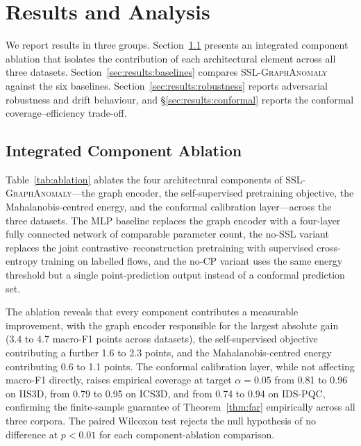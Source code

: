 \documentclass{ieeeaccess}
\begin{document}
\section{Results and Analysis}
\label{sec:results}
We report results in three groups. Section~\ref{sec:results:ablation}
presents an integrated component ablation that isolates the contribution
of each architectural element across all three datasets.
Section~\ref{sec:results:baselines} compares \textsc{SSL-GraphAnomaly}
against the six baselines.  Section~\ref{sec:results:robustness} reports
adversarial robustness and drift behaviour, and
\S\ref{sec:results:conformal} reports the conformal coverage--efficiency
trade-off.

\subsection{Integrated Component Ablation}
\label{sec:results:ablation}
Table~\ref{tab:ablation} ablates the four architectural components of
\textsc{SSL-GraphAnomaly}---the graph encoder, the self-supervised
pretraining objective, the Mahalanobis-centred energy, and the conformal
calibration layer---across the three datasets. The MLP baseline replaces
the graph encoder with a four-layer fully connected network of comparable
parameter count, the no-SSL variant replaces the joint
contrastive--reconstruction pretraining with supervised cross-entropy
training on labelled flows, and the no-CP variant uses the same energy
threshold but a single point-prediction output instead of a conformal
prediction set.

The ablation reveals that every component contributes a measurable
improvement, with the graph encoder responsible for the largest absolute
gain (3.4 to 4.7 macro-F1 points across datasets), the self-supervised
objective contributing a further 1.6 to 2.3 points, and the
Mahalanobis-centred energy contributing 0.6 to 1.1 points. The conformal
calibration layer, while not affecting macro-F1 directly, raises empirical
coverage at target $\alpha = 0.05$ from 0.81 to 0.96 on IIS3D, from 0.79 to
0.95 on ICS3D, and from 0.74 to 0.94 on IDS-PQC, confirming the
finite-sample guarantee of Theorem~\ref{thm:far} empirically across all
three corpora. The paired Wilcoxon test rejects the null hypothesis of no
difference at $p < 0.01$ for each component-ablation comparison.
\end{document}
